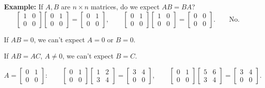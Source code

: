 \documentclass{article}
\begin{document}
\textbf{Example:} If $A, B$ are $n \times n$ matrices, do we expect $AB = BA$?
\[
\begin{bmatrix} 1 & 0 \\ 0 & 0 \end{bmatrix} \begin{bmatrix} 0 & 1 \\ 0 & 0 \end{bmatrix} = \begin{bmatrix} 0 & 1 \\ 0 & 0 \end{bmatrix},
\qquad
\begin{bmatrix} 0 & 1 \\ 0 & 0 \end{bmatrix} \begin{bmatrix} 1 & 0 \\ 0 & 0 \end{bmatrix} = \begin{bmatrix} 0 & 0 \\ 0 & 0 \end{bmatrix}.
\qquad \text{No.}
\]

\newpage

If $AB = 0$, we can't expect $A = 0$ or $B = 0$.

\medskip

If $AB = AC$, $A \neq 0$, we can't expect $B = C$.

\medskip

\[
A = \begin{bmatrix} 0 & 1 \\ 0 & 0 \end{bmatrix}: \qquad
\begin{bmatrix} 0 & 1 \\ 0 & 0 \end{bmatrix} \begin{bmatrix} 1 & 2 \\ 3 & 4 \end{bmatrix} = \begin{bmatrix} 3 & 4 \\ 0 & 0 \end{bmatrix},
\qquad
\begin{bmatrix} 0 & 1 \\ 0 & 0 \end{bmatrix} \begin{bmatrix} 5 & 6 \\ 3 & 4 \end{bmatrix} = \begin{bmatrix} 3 & 4 \\ 0 & 0 \end{bmatrix}.
\]
\end{document}
